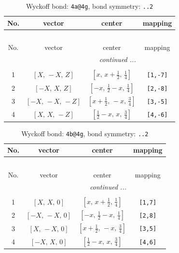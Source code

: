 \documentclass[fleqn,8pt]{jsarticle}
\begin{document}
\begin{longtable}{cccc}
\caption{Wyckoff bond: {\tt 4a@4g}, bond symmetry: {\tt ..2}}
 \\
 \hline \hline
No. & vector & center & mapping \\ \hline \endfirsthead

\multicolumn{3}{l}{\tablename\ \thetable{}} \\
 \hline \hline
No. & vector & center & mapping \\ \hline \endhead

 \hline \hline
\multicolumn{3}{r}{\footnotesize\it continued ...} \\ \endfoot

 \hline \hline
\multicolumn{3}{r}{} \\ \endlastfoot

1 & $\left[ X,\, - X,\, Z \right]$ & $\left[ x,\, x + \frac{1}{2},\, \frac{1}{4} \right]$ & {\tt [1,-7]} \\ \hline
2 & $\left[ - X,\, X,\, Z \right]$ & $\left[ - x,\, \frac{1}{2} - x,\, \frac{1}{4} \right]$ & {\tt [2,-8]} \\ \hline
3 & $\left[ - X,\, - X,\, - Z \right]$ & $\left[ x + \frac{1}{2},\, - x,\, \frac{3}{4} \right]$ & {\tt [3,-5]} \\ \hline
4 & $\left[ X,\, X,\, - Z \right]$ & $\left[ \frac{1}{2} - x,\, x,\, \frac{3}{4} \right]$ & {\tt [4,-6]} \\
\end{longtable}
\renewcommand{\arraystretch}{1.2}
\begin{longtable}{cccc}
\caption{Wyckoff bond: {\tt 4b@4g}, bond symmetry: {\tt ..2}}
 \\
 \hline \hline
No. & vector & center & mapping \\ \hline \endfirsthead

\multicolumn{3}{l}{\tablename\ \thetable{}} \\
 \hline \hline
No. & vector & center & mapping \\ \hline \endhead

 \hline \hline
\multicolumn{3}{r}{\footnotesize\it continued ...} \\ \endfoot

 \hline \hline
\multicolumn{3}{r}{} \\ \endlastfoot

1 & $\left[ X,\, X,\, 0 \right]$ & $\left[ x,\, x + \frac{1}{2},\, \frac{1}{4} \right]$ & {\tt [1,7]} \\ \hline
2 & $\left[ - X,\, - X,\, 0 \right]$ & $\left[ - x,\, \frac{1}{2} - x,\, \frac{1}{4} \right]$ & {\tt [2,8]} \\ \hline
3 & $\left[ X,\, - X,\, 0 \right]$ & $\left[ x + \frac{1}{2},\, - x,\, \frac{3}{4} \right]$ & {\tt [3,5]} \\ \hline
4 & $\left[ - X,\, X,\, 0 \right]$ & $\left[ \frac{1}{2} - x,\, x,\, \frac{3}{4} \right]$ & {\tt [4,6]} \\
\end{longtable}
\end{document}
